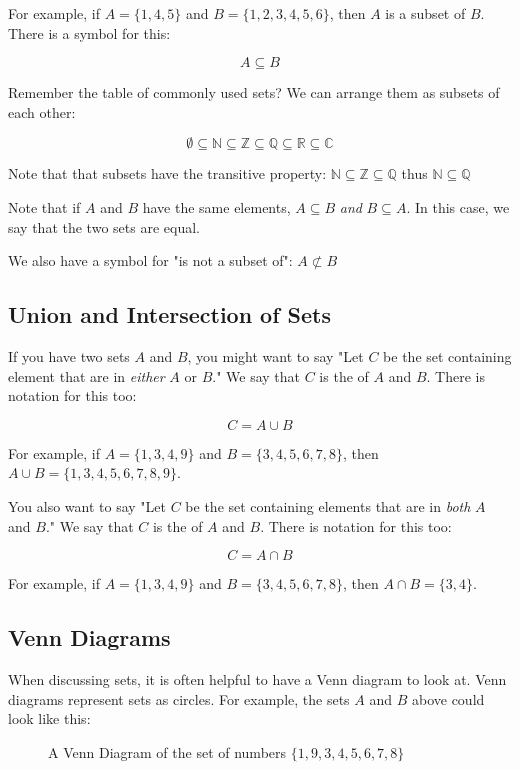 For example, if $A = \{1,4,5\}$ and $B = \{1,2,3,4,5,6\}$, then $A$ is
a subset of $B$.  There is a symbol for this:

$$ A \subseteq B$$

Remember the table of commonly used sets?  We can arrange them as
subsets of each other:

$$\emptyset \subseteq \mathbb{N} \subseteq \mathbb{Z} \subseteq \mathbb{Q} \subseteq \mathbb{R} \subseteq \mathbb{C}$$

Note that that subsets have the transitive property: $\mathbb{N}
\subseteq \mathbb{Z} \subseteq \mathbb{Q}$ thus $\mathbb{N} \subseteq
\mathbb{Q}$

Note that if $A$ and $B$ have the same elements, $A \subseteq B$
\textit{ and } $B \subseteq A$. In this case, we say that the two sets
are equal.

We also have a symbol for "is not a subset of": $A \not\subset B$

\subsection{Union and Intersection of Sets}

If you have two sets $A$ and $B$, you might want to say "Let $C$ be
the set containing element that are in \textit{either} $A$ or $B$."
We say that $C$ is the  of $A$ and $B$.  There is
notation for this too:

$$C = A \cup B$$

For example,  if $A = \{1,3,4,9\}$ and $B = \{3,4,5,6,7,8\}$,  then $A \cup B =  \{1,3,4,5,6,7,8,9\}$.

You also want to say "Let $C$ be the set containing elements that are
in \textit{both} $A$ and $B$."  We say that $C$ is the
 of $A$ and $B$.  There is notation for this
too:

$$C = A \cap B$$

For example,  if $A = \{1,3,4,9\}$ and $B = \{3,4,5,6,7,8\}$,  then $A \cap B =  \{3,4\}$.

\subsection{Venn Diagrams}

When discussing sets, it is often helpful to have a Venn diagram to
look at.  Venn diagrams represent sets as circles. For example, the
sets $A$ and $B$ above could look like this:
\begin{figure}[htbp]
    \centering
    \caption{A Venn Diagram of the set of numbers $\{1,9,3,4,5,6,7,8\}$}
    \label{fig:venn1}
\end{figure}

